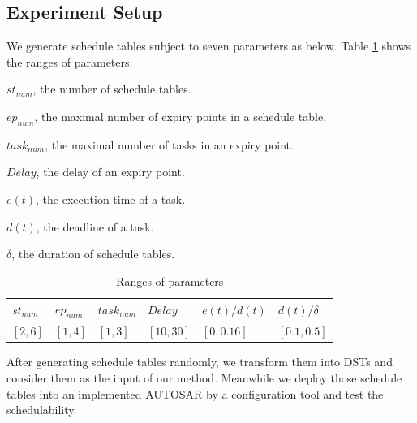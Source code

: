 \documentclass[sigconf]{acmart}
\begin{document}
\subsection{Experiment Setup}
We generate schedule tables subject to seven parameters as below. Table \ref{range} shows the ranges of parameters. 

\begin{compactitem}
  \item $st_{num}$, the number of schedule tables.
  \item $ep_{num}$, the maximal number of expiry points in a schedule table.
  \item $task_{num}$, the maximal number of tasks in an expiry point.
  \item $Delay$, the delay of an expiry point.
  \item $e(t)$, the execution time of a task.
  \item $d(t)$, the deadline of a task.
  \item $\delta$, the duration of schedule tables.
\end{compactitem}
\begin{table}[htbp]
  \centering
  \begin{tabular}{llllll}
    \toprule
    $st_{num}$ & $ep_{num}$ & $task_{num}$ & $Delay$ & $e(t)/d(t)$ & $d(t)/\delta$\\
    \midrule
    $[2,6]$&$[1,4]$&$[1,3]$&$[10,30]$&$[0,0.16]$&$[0.1,0.5]$\\
    \bottomrule
  \end{tabular}
  \caption{Ranges of parameters}\label{range}
\end{table}

After generating schedule tables randomly, we transform them into DSTs and consider them as the input of our method. Meanwhile we deploy those schedule tables into an implemented AUTOSAR by a configuration tool and test the schedulability. 

\end{document}

